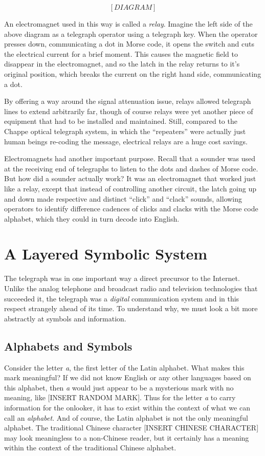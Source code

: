 \documentclass{book}
\begin{document}
\[ [DIAGRAM] \]

An electromagnet used in this way is called a \emph{relay}. Imagine the left side of the above diagram as a telegraph operator using a telegraph key. When the operator presses down, communicating a dot in Morse code, it opens the switch and cuts the electrical current for a brief moment. This causes the magnetic field to disappear in the electromagnet, and so the latch in the relay returns to it's original position, which breaks the current on the right hand side, communicating a dot.

By offering a way around the signal attenuation issue, relays allowed telegraph lines to extend arbitrarily far, though of course relays were yet another piece of equipment that had to be installed and maintained. Still, compared to the Chappe optical telegraph system, in which the ``repeaters'' were actually just human beings re-coding the message, electrical relays are a huge cost savings.

Electromagnets had another important purpose. Recall that a sounder was used at the receiving end of telegraphs to listen to the dots and dashes of Morse code. But how did a sounder actually work? It was an electromagnet that worked just like a relay, except that instead of controlling another circuit, the latch going up and down made respective and distinct ``click'' and ``clack'' sounds, allowing operators to identify difference cadences of clicks and clacks with the Morse code alphabet, which they could in turn decode into English.

\chapter{A Layered Symbolic System}

The telegraph was in one important way a direct precursor to the Internet. Unlike the analog telephone and broadcast radio and television technologies that succeeded it, the telegraph was a \emph{digital} communication system and in this respect strangely ahead of its time. To understand why, we must look a bit more abstractly at symbols and information.

\section{Alphabets and Symbols}

Consider the letter \emph{a}, the first letter of the Latin alphabet. What makes this mark meaningful? If we did not know English or any other languages based on this alphabet, then \emph{a} would just appear to be a mysterious mark with no meaning, like [INSERT RANDOM MARK]. Thus for the letter \emph{a} to carry information for the onlooker, it has to exist within the context of what we can call an \emph{alphabet}. And of course, the Latin alphabet is not the only meaningful alphabet. The traditional Chinese character [INSERT CHINESE CHARACTER] may look meaningless to a non-Chinese reader, but it certainly has a meaning within the context of the traditional Chinese alphabet.
\end{document}
